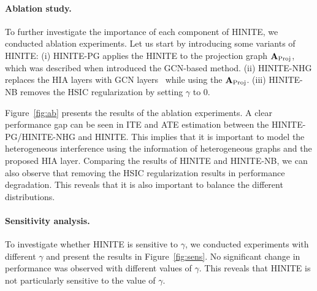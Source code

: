 \documentclass[runningheads]{llncs}
\begin{document}
\paragraph{Ablation study.} To further investigate the importance of each component of HINITE, we conducted ablation experiments. Let us start by introducing some  variants of HINITE: (i) %
HINITE-PG applies the HINITE to the projection graph $\mathbf{A}_{\rm{Proj}}$, which was described when introduced  the GCN-based method.
(ii) HINITE-NHG replaces the HIA layers with GCN layers~\cite{kipf2016semi} while using the $\mathbf{A}_{\rm{Proj}}$. (iii) HINITE-NB removes the HSIC regularization 
by setting $\gamma$ to 0.  %

Figure~\ref{fig:ab} presents the results of the ablation experiments. A clear performance gap can be seen in ITE and ATE estimation between the HINITE-PG/HINITE-NHG and HINITE. This implies that it is important to model the heterogeneous interference using the information of heterogeneous graphs and the proposed HIA layer. Comparing the results of HINITE and HINITE-NB, we can also observe that removing the HSIC regularization results in performance degradation.  This reveals that it is also important to balance the different distributions.
\paragraph{Sensitivity analysis.} To investigate whether HINITE is sensitive to $\gamma$, we conducted experiments with different $\gamma$ and present the results in Figure~\ref{fig:sens}. No significant change in performance was observed with different values of $\gamma$. This reveals that HINITE is not particularly sensitive to the value of  $\gamma$.
\end{document}
